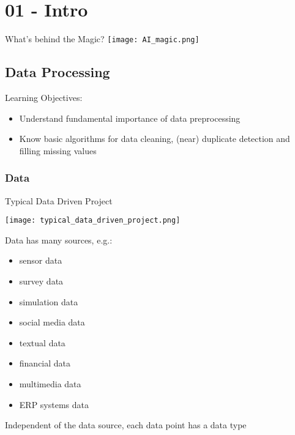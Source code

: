 \section{01 - Intro}

\begin{definition}{What's behind the Magic?} 
    \texttt{[image: AI\_magic.png]}
\end{definition}

\subsection{Data Processing}

\begin{remark}
    Learning Objectives:
    \begin{itemize}
        \item Understand fundamental importance of data preprocessing
        \item Know basic algorithms for data cleaning, (near) duplicate detection and filling missing values
    \end{itemize}
\end{remark}

\subsubsection{Data}

\begin{concept}{Typical Data Driven Project}

    \texttt{[image: typical\_data\_driven\_project.png]}
\end{concept}

\begin{definition}{Data} has many sources, e.g.:
    \begin{itemize}
        \item sensor data
        \item survey data
        \item simulation data
        \item social media data
        \item textual data
        \item financial data
        \item multimedia data
        \item ERP systems data
    \end{itemize}
    
    Independent of the data source, each data point has a data type
\end{definition}

